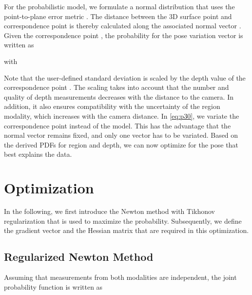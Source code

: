\documentclass[10pt,twocolumn,letterpaper]{article}
\begin{document}
For the probabilistic model, we formulate a normal distribution that uses the point-to-plane error metric \cite{Chen1992}.
The distance between the 3D surface point  and correspondence point  is thereby calculated along the associated normal vector .
Given the correspondence point , the probability for the pose variation vector  is written as

with

Note that the user-defined standard deviation  is scaled by the depth value  of the correspondence point .
The scaling takes into account that the number and quality of depth measurements decreases with the distance to the camera.
In addition, it also ensures compatibility with the uncertainty of the region modality, which increases with the camera distance.
In \cref{eq:p30}, we variate the correspondence point  instead of the model.
This has the advantage that the normal vector remains fixed, and only one vector has to be variated.
Based on the derived \acp{PDF} for region and depth, we can now optimize for the pose that best explains the data.


 

\section{Optimization}\label{sec:o}
In the following, we first introduce the Newton method with Tikhonov regularization that is used to maximize the probability.
Subsequently, we define the gradient vector and the Hessian matrix that are required in this optimization.



\subsection{Regularized Newton Method}\label{ssec:o0}
Assuming that measurements from both modalities are independent, the joint probability function is written as
\end{document}
